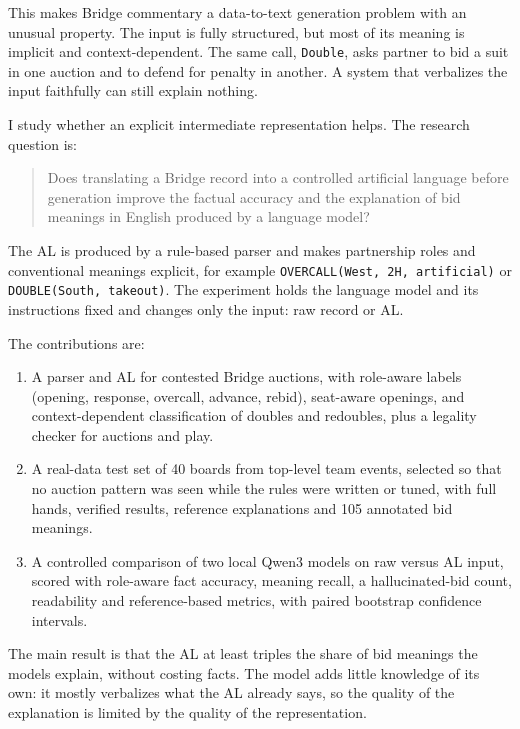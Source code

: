 \documentclass[11pt]{article}
\begin{document}
This makes Bridge commentary a data-to-text generation problem \citep{reiter2000building} with an unusual property. The input is fully structured, but most of its meaning is implicit and context-dependent. The same call, \texttt{Double}, asks partner to bid a suit in one auction and to defend for penalty in another. A system that verbalizes the input faithfully can still explain nothing.

I study whether an explicit intermediate representation helps. The research question is:

\begin{quote}
Does translating a Bridge record into a controlled artificial language before generation improve the factual accuracy and the explanation of bid meanings in English produced by a language model?
\end{quote}

The AL is produced by a rule-based parser and makes partnership roles and conventional meanings explicit, for example \texttt{OVERCALL(West, 2H, artificial)} or \texttt{DOUBLE(South, takeout)}. The experiment holds the language model and its instructions fixed and changes only the input: raw record or AL.

The contributions are:
\begin{enumerate}[leftmargin=*,itemsep=1pt]
    \item A parser and AL for contested Bridge auctions, with role-aware labels (opening, response, overcall, advance, rebid), seat-aware openings, and context-dependent classification of doubles and redoubles, plus a legality checker for auctions and play.
    \item A real-data test set of 40 boards from top-level team events, selected so that no auction pattern was seen while the rules were written or tuned, with full hands, verified results, reference explanations and 105 annotated bid meanings.
    \item A controlled comparison of two local Qwen3 models on raw versus AL input, scored with role-aware fact accuracy, meaning recall, a hallucinated-bid count, readability and reference-based metrics, with paired bootstrap confidence intervals.
\end{enumerate}

The main result is that the AL at least triples the share of bid meanings the models explain, without costing facts. The model adds little knowledge of its own: it mostly verbalizes what the AL already says, so the quality of the explanation is limited by the quality of the representation.
\end{document}

